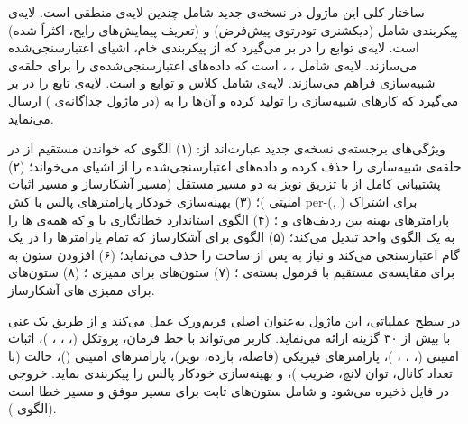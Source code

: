 ساختار کلی این ماژول در نسخه‌ی جدید شامل چندین لایه‌ی منطقی است. لایه‌ی پیکربندی شامل  (دیکشنری تودرتوی پیش‌فرض) و  (تعریف پیمایش‌های رایج، اکثراً  شده) است. لایه‌ی  توابع  را در بر می‌گیرد که از پیکربندی خام، اشیای  اعتبارسنجی‌شده می‌سازند. لایه‌ی  شامل ، ،  است که داده‌های اعتبارسنجی‌شده‌ی  را برای حلقه‌ی شبیه‌سازی فراهم می‌سازند. لایه‌ی  شامل کلاس  و توابع  و  است. لایه‌ی  تابع  را در بر می‌گیرد که کارهای شبیه‌سازی را تولید کرده و آن‌ها را به  (در ماژول جداگانه‌ی ) ارسال می‌نماید.

ویژگی‌های برجسته‌ی نسخه‌ی جدید عبارت‌اند از: (۱) الگوی  که خواندن مستقیم از  در حلقه‌ی شبیه‌سازی را حذف کرده و داده‌های اعتبارسنجی‌شده را از اشیای  می‌خواند؛ (۲) پشتیبانی کامل از  با تزریق نویز  به دو مسیر مستقل (مسیر  آشکارساز و مسیر اثبات امنیتی )؛ (۳) بهینه‌سازی خودکار پارامترهای پالس با کش per-(, ) برای اشتراک پارامترهای بهینه بین ردیف‌های  و ؛ (۴) الگوی استاندارد خطا‌‌نگاری با  و  که همه‌ی ها را به یک الگوی واحد تبدیل می‌کند؛ (۵) الگوی  برای آشکارساز که تمام پارامترها را در یک گام اعتبارسنجی می‌کند و نیاز به  پس از ساخت را حذف می‌نماید؛ (۶) افزودن ستون  به  برای مقایسه‌ی مستقیم  با فرمول بسته‌ی ؛ (۷) ستون‌های  برای ممیزی ؛ (۸) ستون‌های  برای ممیزی های آشکارساز.

در سطح عملیاتی، این ماژول به‌عنوان  اصلی فریم‌ورک عمل می‌کند و از طریق  یک  غنی با بیش از ۳۰ گزینه ارائه می‌نماید. کاربر می‌تواند با خط فرمان، پروتکل (، ، ، )، اثبات امنیتی (، ، ، )، پارامترهای فیزیکی (فاصله، بازده، نویز)، پارامترهای امنیتی ()، حالت  (با تعداد کانال، توان لانچ، ضریب )، و بهینه‌سازی خودکار پالس را پیکربندی نماید. خروجی در فایل  ذخیره می‌شود و شامل ستون‌های ثابت برای مسیر موفق و مسیر خطا است (الگوی ).

